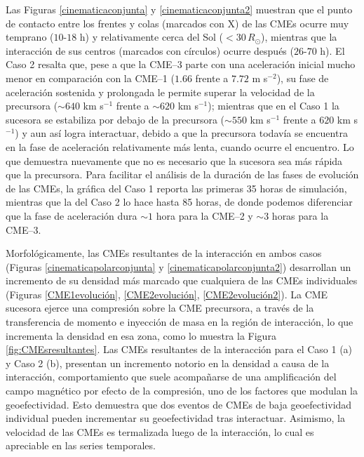 Las Figuras \ref{cinematicaconjunta} y \ref{cinematicaconjunta2} muestran que el punto de contacto entre los frentes y colas (marcados con X) de las CMEs ocurre muy temprano ($10$-$18$ h) y relativamente cerca del Sol ($<30\,R_\odot$), mientras que la interacción de sus centros (marcados con círculos) ocurre después ($26$-$70$ h). El Caso 2 resalta que, pese a que la CME--3 parte con una aceleración inicial mucho menor en comparación con la CME--1 ($1.66$ frente a $7.72$ m s$^{-2}$), su fase de aceleración sostenida y prolongada le permite superar la velocidad de la precursora ($\sim640$ km s$^{-1}$ frente a $\sim620$ km s$^{-1}$); mientras que en el Caso 1 la sucesora se estabiliza por debajo de la precursora ($\sim550$ km s$^{-1}$ frente a $620$ km s$^{-1}$) y aun así logra interactuar, debido a que la precursora todavía se encuentra en la fase de aceleración relativamente más lenta, cuando ocurre el encuentro. Lo que demuestra nuevamente que no es necesario que la sucesora sea más rápida que la precursora. Para facilitar el análisis de la duración de las fases de evolución de las CMEs, la gráfica del Caso 1 reporta las primeras 35 horas de simulación, mientras que la del Caso 2 lo hace hasta 85 horas, de donde podemos diferenciar que la fase de aceleración dura $\sim1$ hora para la CME--2 y $\sim3$ horas para la CME--3.

Morfológicamente, las CMEs resultantes de la interacción en ambos casos (Figuras \ref{cinematicapolarconjunta} y \ref{cinematicapolarconjunta2}) desarrollan un incremento de su densidad más marcado que cualquiera de las CMEs individuales (Figuras \ref{CME1evolución}, \ref{CME2evolución}, \ref{CME2evolución2}). La CME sucesora ejerce una compresión sobre la CME precursora, a través de la transferencia de momento e inyección de masa en la región de interacción, lo que incrementa la densidad en esa zona, como lo muestra la Figura \ref{fig:CMEsresultantes}. Las CMEs resultantes de la interacción para el Caso 1 (a) y Caso 2 (b), presentan un incremento notorio en la densidad a causa de la interacción, comportamiento que suele acompañarse de una amplificación del campo magnético por efecto de la compresión, uno de los factores que modulan la geoefectividad. Esto demuestra que dos eventos de CMEs de baja geoefectividad individual pueden incrementar su geoefectividad tras interactuar. Asimismo, la velocidad de las CMEs es termalizada luego de la interacción, lo cual es apreciable en las series temporales.

